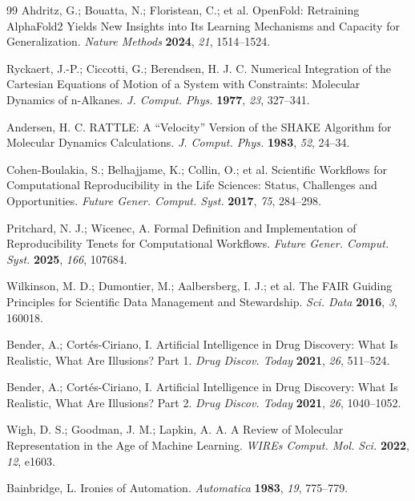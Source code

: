 \documentclass[11pt]{article}
\begin{document}
\begin{thebibliography}{99}
Ahdritz, G.; Bouatta, N.; Floristean, C.; et al.
OpenFold: Retraining AlphaFold2 Yields New Insights into Its Learning Mechanisms and Capacity for Generalization.
\emph{Nature Methods} \textbf{2024}, \emph{21}, 1514--1524.

Ryckaert, J.-P.; Ciccotti, G.; Berendsen, H. J. C.
Numerical Integration of the Cartesian Equations of Motion of a System with Constraints: Molecular Dynamics of n-Alkanes.
\emph{J. Comput. Phys.} \textbf{1977}, \emph{23}, 327--341.

Andersen, H. C.
RATTLE: A ``Velocity'' Version of the SHAKE Algorithm for Molecular Dynamics Calculations.
\emph{J. Comput. Phys.} \textbf{1983}, \emph{52}, 24--34.

Cohen-Boulakia, S.; Belhajjame, K.; Collin, O.; et al.
Scientific Workflows for Computational Reproducibility in the Life Sciences: Status, Challenges and Opportunities.
\emph{Future Gener. Comput. Syst.} \textbf{2017}, \emph{75}, 284--298.

Pritchard, N. J.; Wicenec, A.
Formal Definition and Implementation of Reproducibility Tenets for Computational Workflows.
\emph{Future Gener. Comput. Syst.} \textbf{2025}, \emph{166}, 107684.

Wilkinson, M. D.; Dumontier, M.; Aalbersberg, I. J.; et al.
The FAIR Guiding Principles for Scientific Data Management and Stewardship.
\emph{Sci. Data} \textbf{2016}, \emph{3}, 160018.

Bender, A.; Cort{\'e}s-Ciriano, I.
Artificial Intelligence in Drug Discovery: What Is Realistic, What Are Illusions? Part 1.
\emph{Drug Discov. Today} \textbf{2021}, \emph{26}, 511--524.

Bender, A.; Cort{\'e}s-Ciriano, I.
Artificial Intelligence in Drug Discovery: What Is Realistic, What Are Illusions? Part 2.
\emph{Drug Discov. Today} \textbf{2021}, \emph{26}, 1040--1052.

Wigh, D. S.; Goodman, J. M.; Lapkin, A. A.
A Review of Molecular Representation in the Age of Machine Learning.
\emph{WIREs Comput. Mol. Sci.} \textbf{2022}, \emph{12}, e1603.

Bainbridge, L.
Ironies of Automation.
\emph{Automatica} \textbf{1983}, \emph{19}, 775--779.

\end{thebibliography}
\end{document}
